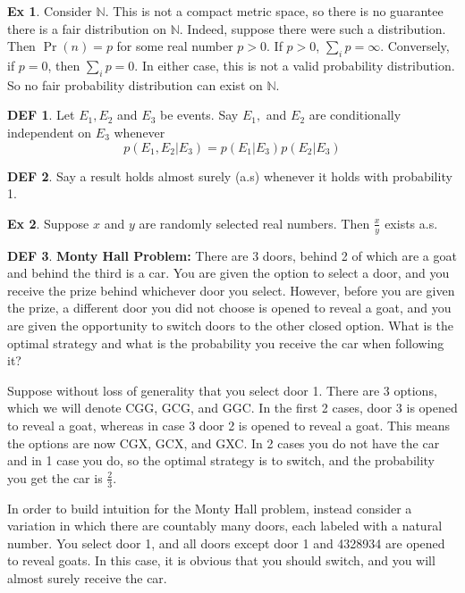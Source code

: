 \documentclass{article}
\theoremstyle{definition}\newtheorem{definition}{DEF}
\theoremstyle{definition}\newtheorem{example}{Ex}
\theoremstyle{lemma}\newtheorem{lemma}{Lemma}
\theoremstyle{corrolary}\newtheorem{corrolary}{Cor}
\begin{document}
\begin{example}
Consider $\mathbb{N}$.
This is not a compact metric space, so there is no guarantee there is a fair distribution on $\mathbb{N}$.
Indeed, suppose there were such a distribution.
Then $\Pr(n) = p$ for some real number $p> 0$.
If $p>0$, $\sum_i p = \infty$.
Conversely, if $p=0$, then $\sum_i p = 0$.
In either case, this is not a valid probability distribution.
So no fair probability distribution can exist on $\mathbb{N}$. 
\end{example}

\begin{definition}
Let $E_1, E_2$ and $E_3$ be events.
Say $E_1,$ and $E_2$ are conditionally independent on $E_3$ whenever
\begin{equation}
p(E_1, E_2 | E_3) = p(E_1 | E_3)p(E_2 | E_3)
\end{equation}
\end{definition}

\begin{definition}
Say a result holds almost surely (a.s) whenever it holds with probability 1.
\end{definition}

\begin{example}
Suppose $x$ and $y$ are randomly selected real numbers.
Then $\frac{x}{y}$ exists a.s.
\end{example}

\begin{definition}
\textbf{Monty Hall Problem:}
There are 3 doors, behind 2 of which are a goat and behind the third is a car.
You are given the option to select a door, and you receive the prize behind whichever door you select.
However, before you are given the prize, a different door you did not choose is opened to reveal a goat, and you are given the opportunity to switch doors to the other closed option.
What is the optimal strategy and what is the probability you receive the car when following it?
\end{definition}

Suppose without loss of generality that you select door 1.
There are 3 options, which we will denote CGG, GCG, and GGC.
In the first 2 cases, door 3 is opened to reveal a goat, whereas in case 3 door 2 is opened to reveal a goat.
This means the options are now CGX, GCX, and GXC.
In 2 cases you do not have the car and in 1 case you do, so the optimal strategy is to switch, and the probability you get the car is $\frac{2}{3}$.

In order to build intuition for the Monty Hall problem, instead consider a variation in which there are countably many doors, each labeled with a natural number.
You select door 1, and all doors except door 1 and 4328934 are opened to reveal goats.
In this case, it is obvious that you should switch, and you will almost surely receive the car.
\end{document}
